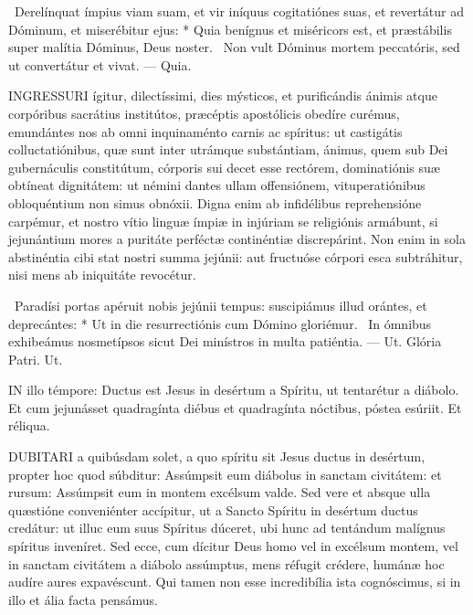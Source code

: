 \R\ Derelínquat ímpius viam suam, et vir iníquus cogitatiónes suas, et revertátur ad Dóminum, et miserébitur ejus: * Quia benígnus et miséricors est, et præstábilis super malítia Dóminus, Deus noster. \V\ Non vult Dóminus mortem peccatóris, sed ut convertátur et vivat. --- Quia.


\lettrine[lines=2]{I}{NGRESSURI} ígitur, dilectíssimi, dies mýsticos, et purificándis ánimis atque corpóribus sacrátius institútos, præcéptis apostólicis obedíre curémus, emundántes nos ab omni inquinaménto carnis ac spíritus: ut castigátis colluctatiónibus, quæ sunt inter utrámque substántiam, ánimus, quem sub Dei gubernáculis constitútum, córporis sui decet esse rectórem, dominatiónis suæ obtíneat dignitátem: ut némini dantes ullam offensiónem, vituperatiónibus obloquéntium non simus obnóxii. Digna enim ab infidélibus reprehensióne carpémur, et nostro vítio linguæ ímpiæ in injúriam se religiónis armábunt, si jejunántium mores a puritáte perféctæ continéntiæ discrepárint. Non enim in sola abstinéntia cibi stat nostri summa jejúnii: aut fructuóse córpori esca subtráhitur, nisi mens ab iniquitáte revocétur.

\R\ Paradísi portas apéruit nobis jejúnii tempus: suscipiámus illud orántes, et deprecántes: * Ut in die resurrectiónis cum Dómino gloriémur. \V\ In ómnibus exhibeámus nosmetípsos sicut Dei minístros in multa patiéntia. --- Ut. Glória Patri. Ut.




\lettrine[lines=2]{I}{N} illo témpore: Ductus est Jesus in desértum a Spíritu, ut tentarétur a diábolo. Et cum jejunásset quadragínta diébus et quadragínta nóctibus, póstea esúriit. Et réliqua.



\lettrine[lines=2]{D}{UBITARI} a quibúsdam solet, a quo spíritu sit Jesus ductus in desértum, propter hoc quod súbditur: Assúmpsit eum diábolus in sanctam civitátem: et rursum: Assúmpsit eum in montem excélsum valde. Sed vere et absque ulla quæstióne conveniénter accípitur, ut a Sancto Spíritu in desértum ductus credátur: ut illuc eum suus Spíritus dúceret, ubi hunc ad tentándum malígnus spíritus inveníret. Sed ecce, cum dícitur Deus homo vel in excélsum montem, vel in sanctam civitátem a diábolo assúmptus, mens réfugit crédere, humánæ hoc audíre aures expavéscunt. Qui tamen non esse incredibília ista cognóscimus, si in illo et ália facta pensámus.

